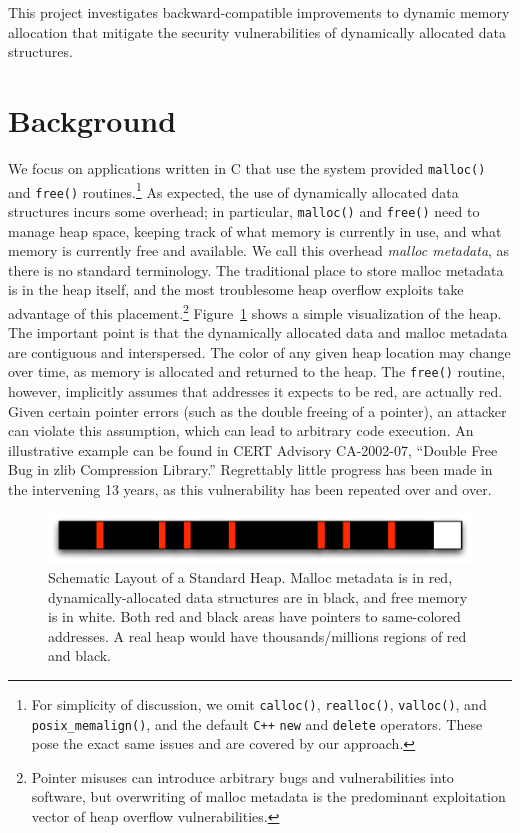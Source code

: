 \documentclass[twoside,12pt]{cslreport}
\begin{document}
This project investigates backward-compatible improvements to dynamic
memory allocation that mitigate the security vulnerabilities of
dynamically allocated data structures.

\section{Background}


We focus on applications written in C that use the system provided
\texttt{malloc()} and \texttt{free()} routines.\footnote{For
  simplicity of discussion, we omit \texttt{calloc()},
  \texttt{realloc()}, \texttt{valloc()}, and
  \texttt{posix\_memalign()}, and the default \texttt{C++}
  \texttt{new} and \texttt{delete} operators. These pose the exact
  same issues and are covered by our approach.}  As expected, the use
of dynamically allocated data structures incurs some overhead; in
particular, \texttt{malloc()} and \texttt{free()} need to manage heap
space, keeping track of what memory is currently in use, and what
memory is currently free and available.  We call this overhead
\emph{malloc metadata\/}, as there is no standard terminology.  The
traditional place to store malloc metadata is in the heap itself, and the most troublesome
heap overflow exploits take advantage of this placement.\footnote{Pointer misuses can introduce
  arbitrary bugs and vulnerabilities into software, but overwriting of
  malloc metadata is the predominant exploitation vector of heap
  overflow vulnerabilities.} Figure~\ref{heap-example} shows a
simple visualization of the heap.  The important point is that the
dynamically allocated data and malloc metadata are contiguous and
interspersed. The color of any given heap location may change over
time, as memory is allocated and returned to the heap.  The
\texttt{free()} routine, however, implicitly assumes that addresses it
expects to be red, are actually red. Given certain pointer errors
(such as the double freeing of a pointer), an attacker can violate
this assumption, which can lead to arbitrary code execution.  An
illustrative example can be found in CERT Advisory CA-2002-07,
``Double Free Bug in zlib Compression Library.'' Regrettably little
progress has been made in the intervening 13 years, as this
vulnerability has been repeated over and over.

\begin{figure}
\begin{center}
\includegraphics{heap-example}
\end{center}
\caption[Schematic Layout of a Standard Heap]{Schematic Layout of a
  Standard Heap. Malloc metadata is in red, dynamically-allocated data
  structures are in black, and free memory is in white. Both red and
  black areas have pointers to same-colored addresses. A real heap
  would have thousands/millions regions of red and black.}
\label{heap-example}
\end{figure}
\end{document}
